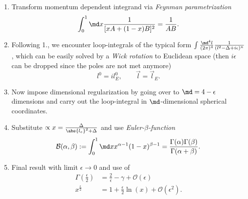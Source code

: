 \begin{enumerate}
	\item Transform momentum dependent integrand via \emph{Feynman parametrization}
	\begin{equation}
		\int_0^1 \md x \frac{1}{[xA+(1-x)B]^2} = \frac{1}{AB}.
	\end{equation}
	\item Following 1., we encounter loop-integrals of the typical form $\int \frac{\md^4 l}{(2 \pi)^4} \frac{1}{(l^2-\Delta +i \epsilon)^n}$, which can be easily solved by a \emph{Wick rotation} to Euclidean space (then $i\epsilon$ can be dropped since the poles are not met anymore)
	\begin{equation}
		l^0 = i l^0_E, \qquad \vec{l}=\vec{l}_E.
	\end{equation}
	\item Now impose dimensional regularization by going over to $\md=4-\epsilon$ dimensions and carry out the loop-integral in $\md$-dimensional spherical coordinates.
	\item Substitute $\propto x=\frac{\Delta}{\abs{l_e}^2+\Delta}$ and use \emph{Euler-$\beta$-function}
	\begin{equation}
		\mathcal{B}(\alpha, \beta) := \int_0^1 \md x x^{\alpha-1} (1-x)^{\beta-1}  = \frac{\Gamma(\alpha) \Gamma(\beta)}{\Gamma(\alpha+\beta)}.
	\end{equation}
	\item Final result with limit $\epsilon \rightarrow 0$ and use of 
	\begin{align}
		\Gamma(\frac{\epsilon}{2}) &= \frac{2}{\epsilon} - \gamma + \mathcal{O}(\epsilon) \\
		x^{\frac{\epsilon}{2}} &= 1 + \frac{\epsilon}{2} \ln(x)+ \mathcal{O}(\epsilon^2).
	\end{align}
\end{enumerate}



